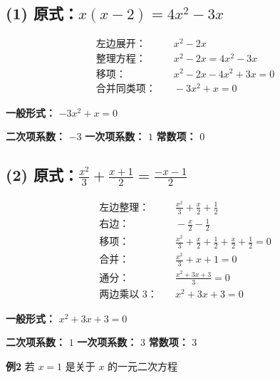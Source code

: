 \documentclass[12pt]{article}
\begin{document}
\subsection*{(1) 原式：\quad \( x(x - 2) = 4x^2 - 3x \)}

\begin{align*}
  \text{左边展开：}  & \quad x^2 - 2x                 \\
  \text{整理方程：}  & \quad x^2 - 2x = 4x^2 - 3x     \\
  \text{移项：}    & \quad x^2 - 2x - 4x^2 + 3x = 0 \\
  \text{合并同类项：} & \quad -3x^2 + x = 0
\end{align*}

\textbf{一般形式：} \quad \( -3x^2 + x = 0 \)

\textbf{二次项系数：} \(-3\)
\textbf{一次项系数：} \(1\)
\textbf{常数项：} \(0\)

\vspace{1em}

\subsection*{(2) 原式：\quad \( \frac{x^2}{3} + \frac{x + 1}{2} = \frac{-x - 1}{2} \)}

\begin{align*}
  \text{左边整理：}   & \quad \frac{x^2}{3} + \frac{x}{2} + \frac{1}{2}                                 \\
  \text{右边：}     & \quad -\frac{x}{2} - \frac{1}{2}                                                \\
  \text{移项：}     & \quad \frac{x^2}{3} + \frac{x}{2} + \frac{1}{2} + \frac{x}{2} + \frac{1}{2} = 0 \\
  \text{合并：}     & \quad \frac{x^2}{3} + x + 1 = 0                                                 \\
  \text{通分：}     & \quad \frac{x^2 + 3x + 3}{3} = 0                                                \\
  \text{两边乘以 3：} & \quad x^2 + 3x + 3 = 0
\end{align*}

\textbf{一般形式：} \quad \( x^2 + 3x + 3 = 0 \)

\textbf{二次项系数：} \(1\)
\textbf{一次项系数：} \(3\)
\textbf{常数项：} \(3\) \newline


\textbf{例2} 若 \(x = 1\) 是关于 \(x\) 的一元二次方程
\end{document}
